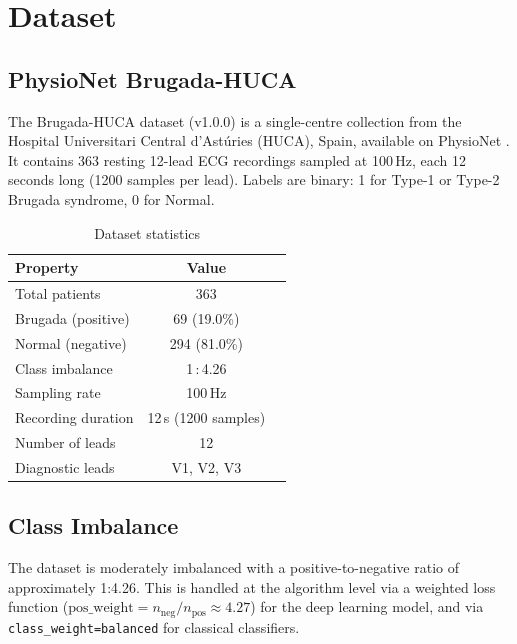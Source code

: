 \documentclass[journal, 10pt, twoside]{IEEEtran}
\begin{document}
\section{Dataset}
\label{sec:dataset}

\subsection{PhysioNet Brugada-HUCA}

The Brugada-HUCA dataset \cite{dataset} (v1.0.0) is a single-centre
collection from the Hospital Universitari Central d'Astúries (HUCA), Spain,
available on PhysioNet \cite{physionet}.
It contains 363 resting 12-lead ECG recordings sampled at 100\,Hz,
each 12 seconds long (1200 samples per lead).
Labels are binary: 1 for Type-1 or Type-2 Brugada syndrome,
0 for Normal.

\begin{table}[h]
  \centering
  \caption{Dataset statistics}
  \label{tab:dataset}
  \begin{tabular}{lcc}
    \toprule
    \textbf{Property} & \textbf{Value} \\
    \midrule
    Total patients       & 363 \\
    Brugada (positive)   & 69 (19.0\%) \\
    Normal (negative)    & 294 (81.0\%) \\
    Class imbalance      & 1\,:\,4.26 \\
    Sampling rate        & 100\,Hz \\
    Recording duration   & 12\,s (1200 samples) \\
    Number of leads      & 12 \\
    Diagnostic leads     & V1, V2, V3 \\
    \bottomrule
  \end{tabular}
\end{table}

\subsection{Class Imbalance}

The dataset is moderately imbalanced with a positive-to-negative ratio of
approximately 1:4.26.
This is handled at the algorithm level via a weighted loss function
($\text{pos\_weight} = n_\text{neg} / n_\text{pos} \approx 4.27$) for the
deep learning model, and via \texttt{class\_weight=balanced} for classical
classifiers.
\end{document}
